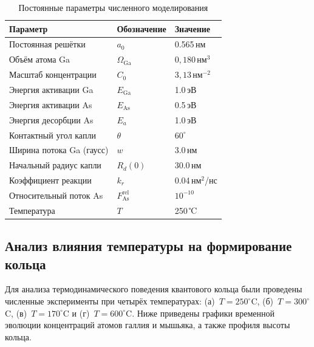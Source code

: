 \documentclass[14pt,oneside]{extarticle}
\begin{document}
\begin{table}
    \centering
    \caption{Постоянные параметры численного моделирования}
    \label{tab:params-fixed}
    \begin{tabular}{|l|l|l|}
    \hline
    \textbf{Параметр} & \textbf{Обозначение} & \textbf{Значение} \\ \hline
    Постоянная решётки & $a_0$ & 0.565\,нм \\ \hline
    Объём атома Ga & $\Omega_{\text{Ga}}$ &  $0{,}180\,\text{нм}^3$ \\ \hline
    Масштаб концентрации & $C_0$ & $ 3{,}13\,\text{нм}^{-2}$ \\ \hline
    Энергия активации Ga & $E_{\text{Ga}}$ & 1.0\,эВ \\ \hline
    Энергия активации As & $E_{\text{As}}$ & 0.5\,эВ \\ \hline
    Энергия десорбции As & $E_a$ & 1.0\,эВ \\ \hline
    Контактный угол капли & $\theta$ & $60^\circ$ \\ \hline
    Ширина потока Ga (гаусс) & $w$ & 3.0\,нм \\ \hline
    Начальный радиус капли & $R_d(0)$ & 30.0\,нм \\ \hline
    Коэффициент реакции & $k_r$ & 0.04\,нм$^2$/нс \\ \hline
    Относительный поток As & $F_{\text{As}}^{\text{rel}}$ & $10^{-10}$ \\ \hline
    Температура & $T$ & 250\,℃ \\ \hline
    \end{tabular}
\end{table}    

\subsection{Анализ влияния температуры на формирование кольца}

Для анализа термодинамического поведения квантового кольца были проведены численные эксперименты при четырёх температурах: (а)~$T = 250^\circ$C, (б)~$T = 300^\circ$C, (в)~$T = 170^\circ$C и (г)~$T = 600^\circ$C. Ниже приведены графики временной эволюции концентраций атомов галлия и мышьяка, а также профиля высоты кольца.    
\end{document}

